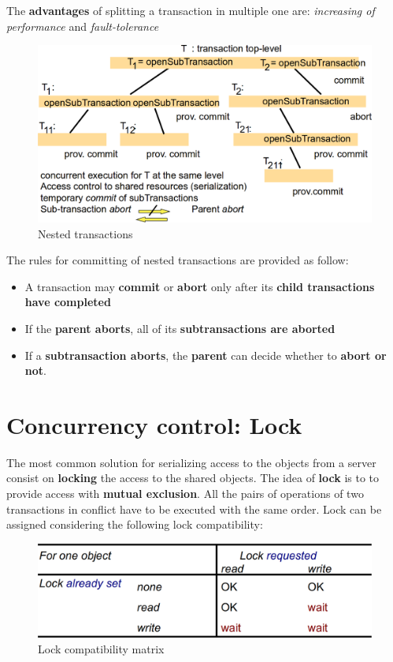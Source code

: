 The \textbf{advantages} of splitting a transaction in multiple one are: \textit{increasing of performance} and \textit{fault-tolerance}

\begin{figure}[!h]
    \centering
    \includegraphics[width=.60\linewidth]{images/TransactionAndConcurrencyControl/subtransactions.png}
    \caption{Nested transactions}
\end{figure}

The rules for committing of nested transactions are provided as follow:
\begin{itemize}
    \item A transaction may \textbf{commit} or \textbf{abort} only after its \textbf{child transactions have completed}
    \item If the \textbf{parent aborts}, all of its \textbf{subtransactions are aborted}
    \item If a \textbf{subtransaction aborts}, the \textbf{parent} can decide whether to \textbf{abort or not}.
\end{itemize}

\section{Concurrency control: Lock}
The most common solution for serializing access to the objects from a server consist on \textbf{locking} the access to the shared objects. The idea of \textbf{lock} is to to provide access with \textbf{mutual exclusion}. All the pairs of operations of two transactions in conflict have to be executed with the same order. Lock can be assigned considering the following lock compatibility:

\begin{figure}[!h]
    \centering
    \includegraphics[width=.70\linewidth]{images/TransactionAndConcurrencyControl/lockCompatibilityMat.png}
    \caption{Lock compatibility matrix}
\end{figure}

